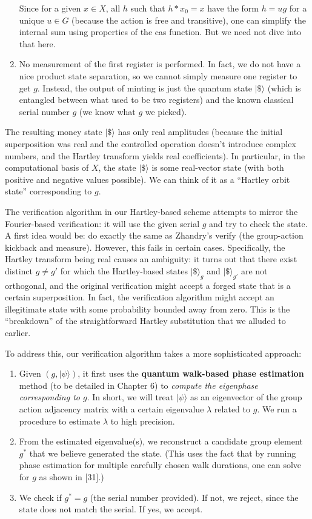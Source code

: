 \documentclass[11pt]{article}
\theoremstyle{definition}
\begin{document}
\begin{enumerate}
\[    \] 
    Since for a given $x\in X$, all $h$ such that $h*x_0=x$ have the form $h = u g$ for a unique $u \in G$ (because the action is free and transitive), one can simplify the internal sum using properties of the cas function. But we need not dive into that here.
    \item No measurement of the first register is performed. In fact, we do not have a nice product state separation, so we cannot simply measure one register to get $g$. Instead, the output of minting is just the quantum state $|\$\rangle$ (which is entangled between what used to be two registers) and the known classical serial number $g$ (we know what $g$ we picked).
\end{enumerate}

The resulting money state $|\$\rangle$ has only real amplitudes (because the initial superposition was real and the controlled operation doesn’t introduce complex numbers, and the Hartley transform yields real coefficients). In particular, in the computational basis of $X$, the state $|\$\rangle$ is some real-vector state (with both positive and negative values possible). We can think of it as a “Hartley orbit state” corresponding to $g$.

The verification algorithm in our Hartley-based scheme attempts to mirror the Fourier-based verification: it will use the given serial $g$ and try to check the state. A first idea would be: do exactly the same as Zhandry’s verify (the group-action kickback and measure). However, this fails in certain cases. Specifically, the Hartley transform being real causes an ambiguity: it turns out that there exist distinct $g \neq g'$ for which the Hartley-based states $|\$\rangle_g$ and $|\$\rangle_{g'}$ are not orthogonal, and the original verification might accept a forged state that is a certain superposition. In fact, the verification algorithm might accept an illegitimate state with some probability bounded away from zero. This is the “breakdown” of the straightforward Hartley substitution that we alluded to earlier.

To address this, our verification algorithm takes a more sophisticated approach:
\begin{enumerate}
    \item Given $(g, |\psi\rangle)$, it first uses the \textbf{quantum walk-based phase estimation} method (to be detailed in Chapter 6) to \emph{compute the eigenphase corresponding to $g$}. In short, we will treat $|\psi\rangle$ as an eigenvector of the group action adjacency matrix with a certain eigenvalue $\lambda$ related to $g$. We run a procedure to estimate $\lambda$ to high precision.
    \item From the estimated eigenvalue(s), we reconstruct a candidate group element $g^*$ that we believe generated the state. (This uses the fact that by running phase estimation for multiple carefully chosen walk durations, one can solve for $g$ as shown in [31].)
    \item We check if $g^* = g$ (the serial number provided). If not, we reject, since the state does not match the serial. If yes, we accept.
\end{enumerate}
\end{document}
